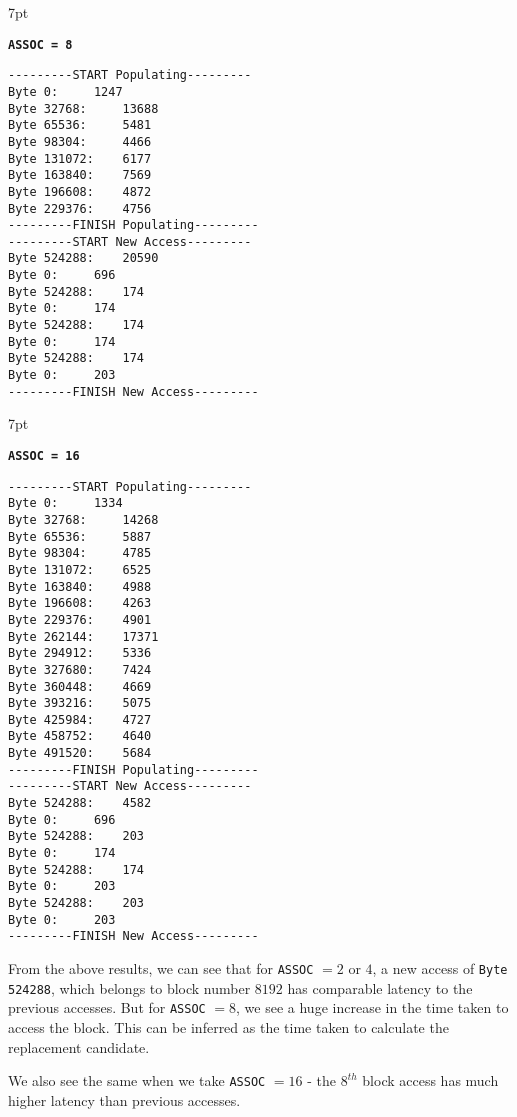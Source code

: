 \documentclass[12pt,a4paper,english]{paper}
\newenvironment{results}{%
  \def\FrameCommand{%
    \hspace{1pt}%
    {\color{blue}\vrule width 2pt}%
    {\color{formalblue}\vrule width 4pt}%
    \colorbox{formalblue}%
  }%
  \MakeFramed{\advance\hsize-\width\FrameRestore}%
  \noindent\hspace{-4.55pt}%
  \begin{adjustwidth}{7pt}{}%
  \vspace{2pt}\vspace{2pt}%
}
{%
  \vspace{2pt}\end{adjustwidth}\endMakeFramed%
}
\begin{document}
\begin{results}
\texttt{\textbf{ASSOC = 8}}
\begin{verbatim}
---------START Populating---------
Byte 0: 	1247
Byte 32768: 	13688
Byte 65536: 	5481
Byte 98304: 	4466
Byte 131072: 	6177
Byte 163840: 	7569
Byte 196608: 	4872
Byte 229376: 	4756
---------FINISH Populating---------
---------START New Access---------
Byte 524288: 	20590
Byte 0: 	696
Byte 524288: 	174
Byte 0: 	174
Byte 524288: 	174
Byte 0: 	174
Byte 524288: 	174
Byte 0: 	203
---------FINISH New Access---------
\end{verbatim}
\end{results}

\begin{results}
\texttt{\textbf{ASSOC = 16}}
\begin{verbatim}
---------START Populating---------
Byte 0: 	1334
Byte 32768: 	14268
Byte 65536: 	5887
Byte 98304: 	4785
Byte 131072: 	6525
Byte 163840: 	4988
Byte 196608: 	4263
Byte 229376: 	4901
Byte 262144: 	17371
Byte 294912: 	5336
Byte 327680: 	7424
Byte 360448: 	4669
Byte 393216: 	5075
Byte 425984: 	4727
Byte 458752: 	4640
Byte 491520: 	5684
---------FINISH Populating---------
---------START New Access---------
Byte 524288: 	4582
Byte 0: 	696
Byte 524288: 	203
Byte 0: 	174
Byte 524288: 	174
Byte 0: 	203
Byte 524288: 	203
Byte 0: 	203
---------FINISH New Access---------
\end{verbatim}
\end{results}

From the above results, we can see that for \texttt{ASSOC} $=2$ or $4$, a new access of \texttt{Byte 524288}, which belongs to block number $8192$ has comparable latency to the previous accesses. But for \texttt{ASSOC} $=8$, we see a huge increase in the time taken to access the block. This can be inferred as the time taken to calculate the replacement candidate.

We also see the same when we take \texttt{ASSOC} $=16$ - the $8^{th}$ block access has much higher latency than previous accesses.


\newpage %



\end{document}
